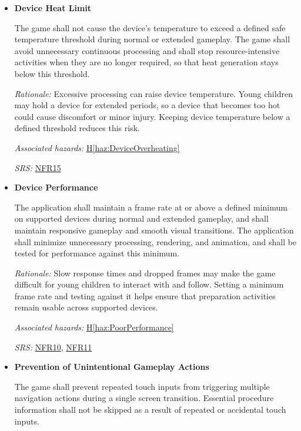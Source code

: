 \documentclass{article}
\newcounter{hazard}
\newcommand{\hazref}[1]{\hyperref[haz:#1]{H\ref*{haz:#1}}}
\newcounter{sr}
\newcommand{\srdef}[1]{\refstepcounter{sr}\label{sr:#1}\textbf{SR-\thesr:}}
\newcommand{\srsurl}{https://team-hindsight.github.io/ophthamology-game/SRS-IEEE/SRS.pdf}
\newcommand{\srsnfrref}[2]{\href{\srsurl\#nameddest=#1}{NFR#2}}
\begin{document}
\begin{itemize}[leftmargin=1.5cm, labelwidth=1.3cm, labelsep=0.2cm,
  align=left, itemsep=1.2em, parsep=0.6em]

\item[\srdef{DeviceResourceUse}]
\textbf{Device Heat Limit}

The game shall not cause the device's temperature to exceed
a defined safe temperature threshold during normal or extended
gameplay. The game shall avoid unnecessary continuous
processing and shall stop resource-intensive activities when
they are no longer required, so that heat generation stays
below this threshold.

\textit{Rationale:}
Excessive processing can raise device temperature. Young
children may hold a device for extended periods, so a device
that becomes too hot could cause discomfort or minor injury.
Keeping device temperature below a defined threshold reduces
this risk.

\textit{Associated hazards:}
\hazref{DeviceOverheating}

\textit{SRS:} \srsnfrref{NFR_DeviceHeat}{15}

\item[\srdef{DevicePerformance}]
\textbf{Device Performance}

The application shall maintain a frame rate at or above a
defined minimum on supported devices during normal and
extended gameplay, and shall maintain responsive gameplay
and smooth visual transitions. The application shall minimize
unnecessary processing, rendering, and animation, and shall be
tested for performance against this minimum.

\textit{Rationale:}
Slow response times and dropped frames may make the game
difficult for young children to interact with and follow.
Setting a minimum frame rate and testing against it helps
ensure that preparation activities remain usable across
supported devices.

\textit{Associated hazards:}
\hazref{PoorPerformance}

\textit{SRS:} \srsnfrref{NFR_Responsiveness}{10}, \srsnfrref{NFR_Smoothness}{11}

\item[\srdef{PreventAccidentalInput}]
\textbf{Prevention of Unintentional Gameplay Actions}

The game shall prevent repeated touch inputs from
triggering multiple navigation actions during a
single screen transition. Essential procedure
information shall not be skipped as a result
of repeated or accidental touch inputs.


\end{itemize}
\end{document}
